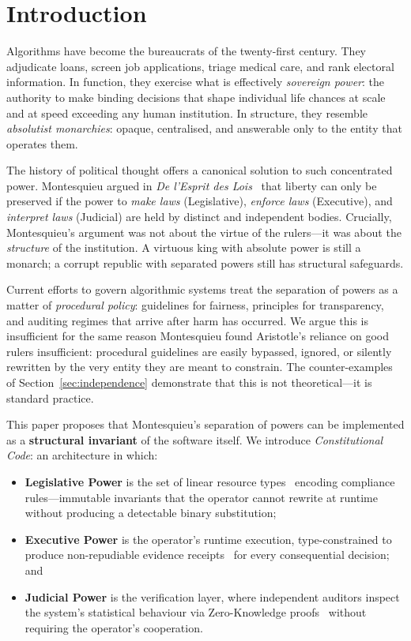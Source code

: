 \section{Introduction}
\label{sec:intro}

Algorithms have become the bureaucrats of the twenty-first century.
They adjudicate loans, screen job applications, triage medical care,
and rank electoral information. In function, they exercise what is
effectively \emph{sovereign power}: the authority to make binding
decisions that shape individual life chances at scale and at speed
exceeding any human institution. In structure, they resemble
\emph{absolutist monarchies}: opaque, centralised, and answerable
only to the entity that operates them.

The history of political thought offers a canonical solution to such
concentrated power. Montesquieu argued in \textit{De l'Esprit des
Lois}~\cite{montesquieu1748} that liberty can only be preserved if
the power to \emph{make laws} (Legislative), \emph{enforce laws}
(Executive), and \emph{interpret laws} (Judicial) are held by
distinct and independent bodies. Crucially, Montesquieu's argument
was not about the virtue of the rulers---it was about the
\emph{structure} of the institution. A virtuous king with absolute
power is still a monarch; a corrupt republic with separated powers
still has structural safeguards.

Current efforts to govern algorithmic systems treat the separation of
powers as a matter of \emph{procedural policy}: guidelines for
fairness, principles for transparency, and auditing regimes that
arrive after harm has occurred. We argue this is insufficient for
the same reason Montesquieu found Aristotle's reliance on
good rulers insufficient: procedural guidelines are easily bypassed,
ignored, or silently rewritten by the very entity they are meant to
constrain. The counter-examples of Section~\ref{sec:independence}
demonstrate that this is not theoretical---it is standard practice.

This paper proposes that Montesquieu's separation of powers can be
implemented as a \textbf{structural invariant} of the software
itself. We introduce \emph{Constitutional Code}: an architecture in
which:
\begin{itemize}
  \item \textbf{Legislative Power} is the set of linear resource
  types~\cite{btv2026} encoding compliance rules---immutable
  invariants that the operator cannot rewrite at runtime without
  producing a detectable binary substitution;
  \item \textbf{Executive Power} is the operator's runtime
  execution, type-constrained to produce non-repudiable evidence
  receipts~\cite{btv-t-repo} for every consequential decision; and
  \item \textbf{Judicial Power} is the verification layer, where
  independent auditors inspect the system's statistical behaviour
  via Zero-Knowledge proofs~\cite{btv-ar2026} without requiring the
  operator's cooperation.
\end{itemize}

